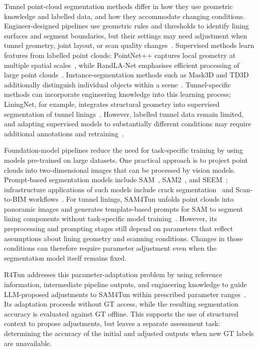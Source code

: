\documentclass[a4paper,fleqn]{cas-dc}
\begin{document}
{Tunnel point-cloud segmentation methods differ in how they use geometric knowledge and labelled data, and how they accommodate changing conditions. Engineer-designed pipelines use geometric rules and thresholds to identify lining surfaces and segment boundaries, but their settings may need adjustment when tunnel geometry, joint layout, or scan quality changes~\cite{huang2021bim,weidner2024generalized,wang2025automated}. Supervised methods learn features from labelled point clouds: PointNet++ captures local geometry at multiple spatial scales~\cite{qi2017pointnet}, while RandLA-Net emphasises efficient processing of large point clouds~\cite{hu2020randla}. Instance-segmentation methods such as Mask3D and TD3D additionally distinguish individual objects within a scene~\cite{schult2023mask3d,kolodiazhnyi2024td3d}. Tunnel-specific methods can incorporate engineering knowledge into this learning process; LiningNet, for example, integrates structural geometry into supervised segmentation of tunnel linings~\cite{lin2025liningnet}. However, labelled tunnel data remain limited, and adapting supervised models to substantially different conditions may require additional annotations and retraining~\cite{su2024review, cha2024deep}.

Foundation-model pipelines reduce the need for task-specific training by using models pre-trained on large datasets. One practical approach is to project point clouds into two-dimensional images that can be processed by vision models. Prompt-based segmentation models include SAM~\cite{kirillov2023sam}, SAM2~\cite{ravi2024sam2}, and SEEM~\cite{zou2023segment}; infrastructure applications of such models include crack segmentation~\cite{ge2024cracksam,ye2024sam} and Scan-to-BIM workflows~\cite{wang2024omni,pan2024zero,ye2026maintenance}. For tunnel linings, SAM4Tun unfolds point clouds into panoramic images and generates template-based prompts for SAM to segment lining components without task-specific model training~\cite{ye2025sam4tun}. However, its preprocessing and prompting stages still depend on parameters that reflect assumptions about lining geometry and scanning conditions. Changes in those conditions can therefore require parameter adjustment even when the segmentation model itself remains fixed.

R4Tun addresses this parameter-adaptation problem by using reference information, intermediate pipeline outputs, and engineering knowledge to guide LLM-proposed adjustments to SAM4Tun within prescribed parameter ranges~\cite{taoR4Tun}. Its adaptation proceeds without GT access, while the resulting segmentation accuracy is evaluated against GT offline. This supports the use of structured context to propose adjustments, but leaves a separate assessment task: determining the accuracy of the initial and adjusted outputs when new GT labels are unavailable.

}
\end{document}
